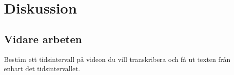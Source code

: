 \chapter{Diskussion}

\section{Vidare arbeten}
Bestäm ett tidsintervall på videon du vill transkribera och få ut texten
från enbart det tidsintervallet. 
